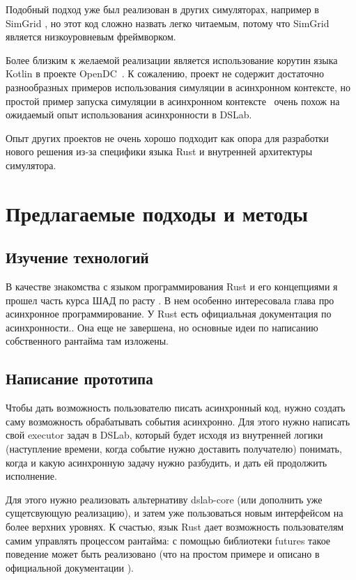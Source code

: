 Подобный подход уже был реализован в других симуляторах, например в SimGrid \cite{simgrid-example}, но этот код сложно назвать легко читаемым, потому что SimGrid является низкоуровневым фреймворком.

Более близким к желаемой реализации является использование корутин языка Kotlin в проекте OpenDC~\cite{opendc-repo}. К сожалению, проект не содержит достаточно разнообразных примеров использования симуляции в асинхронном контексте, но простой пример запуска симуляции в асинхронном контексте~\cite{opendc-example} очень похож на ожидаемый опыт использования асинхронности в DSLab.


Опыт других проектов не очень хорошо подходит как опора для разработки нового решения из-за специфики языка Rust и внутренней архитектуры симулятора.

\section{Предлагаемые подходы и методы} 

\subsection{Изучение технологий}
В качестве знакомства с языком программирования Rust и его концепциями я прошел часть курса ШАД по расту \cite{shad-rust}. В нем особенно интересовала глава про асинхронное программирование. У Rust есть официальная документация по асинхронности.\cite{async-book}. Она еще не завершена, но основные идеи по написанию собственного рантайма там изложены.


\subsection{Написание прототипа}
Чтобы дать возможность пользователю писать асинхронный код, нужно создать саму возможность обрабатывать события асинхронно. Для этого нужно написать свой executor задач в DSLab, который будет исходя из внутренней логики (наступление времени, когда событие нужно доставить получателю) понимать, когда и какую асинхронную задачу нужно разбудить, и дать ей продолжить исполнение. 

Для этого нужно реализовать альтернативу dslab-core (или дополнить уже сущетсвующую реализацию), и затем уже пользоваться новым интерфейсом на более верхних уровнях. К счастью, язык Rust дает возможность пользователям самим управлять процессом рантайма: с помощью библиотеки futures \cite{rust-futures} такое поведение может быть реализовано (что на простом примере и описано в официальной документации \cite{async-book}).

